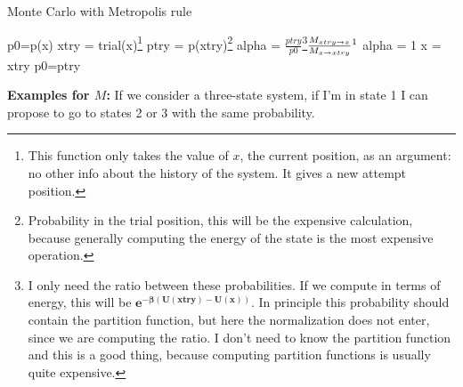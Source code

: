 \begin{minipage}{\textwidth}
\renewcommand*\footnoterule{}
\begin{savenotes}
\begin{algorithm}[H]\label{metropolis_generic}
			\caption{Monte Carlo with Metropolis rule}
			\begin{algorithmic}[0]
				\State p0=p(x)
					\State xtry = trial(x)\footnote{This function only takes the value of $x$, the current position, as an argument: no other info about the history of the system. It gives a new attempt position.}
					\State ptry = p(xtry)\footnote{Probability in the trial position, this will be the expensive calculation, because generally computing the energy of the state is the most expensive operation.}
					\State alpha =  $\frac{ptry}{p0}$\footnote{I only need the ratio between these probabilities. If we compute in terms of energy, this will be $\mathbf{e^{-\beta(U(xtry)-U(x))}}$. In principle this probability should contain the partition function, but here the normalization does not enter, since we are computing the ratio. I don't need to know the partition function and this is a good thing, because computing partition functions is usually quite expensive.}$\frac{M_{xtry \rightarrow x}}{M_{x\rightarrow xtry}}\footnote{This term is often NOT included, because when the probability of proposing a move and the opposite one are identical, they cancel each other. If they are not identical, this term must be included or we would make a mistake.}$
						\State alpha = 1
					\EndIf
						\State x = xtry
						\State p0=ptry
					\EndIf
				\EndFor
			\end{algorithmic}
		\end{algorithm}
\end{savenotes}
\end{minipage}
\textbf{Examples for $M$:}
If we consider a three-state system, if I'm in state 1 I can propose to go to states 2 or 3 with the same probability.\\
